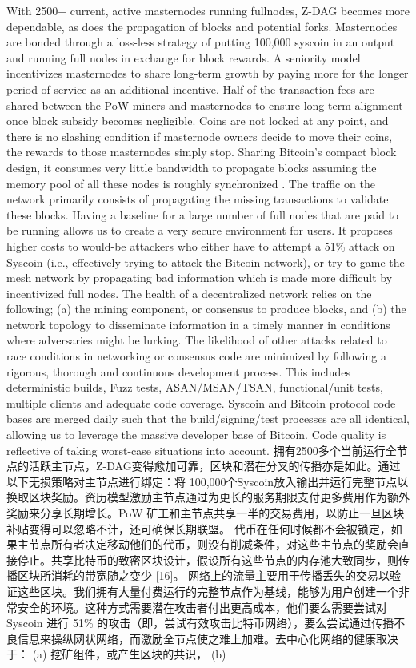 \documentclass{ctexart}
\begin{document}
With 2500+ current, active masternodes running fullnodes, Z-DAG becomes more dependable, as does the propagation of blocks and potential forks. Masternodes are bonded through a loss-less strategy of putting 100,000 syscoin in an output and running full nodes in exchange for block rewards. A seniority model incentivizes masternodes to share long-term growth by paying more for the longer period of service as an additional incentive. Half of the transaction fees are shared between the PoW miners and masternodes to ensure long-term alignment once block subsidy becomes negligible. Coins are not locked at any point, and there is no slashing condition if masternode owners decide to move their coins, the rewards to those masternodes simply stop. Sharing Bitcoin’s compact block design, it consumes very little bandwidth to propagate blocks assuming the memory pool of all these nodes is roughly synchronized \cite{BitCore}. The traffic on the network primarily consists of propagating the missing transactions to validate these blocks. Having a baseline for a large number of full nodes that are paid to be running allows us to create a very secure environment for users. It proposes higher costs to would-be attackers who either have to attempt a 51\% attack on Syscoin (i.e., effectively trying to attack the Bitcoin network), or try to game the mesh network by propagating bad information which is made more difficult by incentivized full nodes. The health of a decentralized network relies on the following; (a) the mining component, or consensus to produce blocks, and (b) the network topology to disseminate information in a timely manner in conditions where adversaries might be lurking. The likelihood of other attacks related to race conditions in networking or consensus code are minimized by following a rigorous, thorough and continuous development process. This includes deterministic builds, Fuzz tests, ASAN/MSAN/TSAN, functional/unit tests, multiple clients and adequate code coverage. Syscoin and Bitcoin protocol code bases are merged daily such that the build/signing/test processes are all identical, allowing us to leverage the massive developer base of Bitcoin.  Code quality is reflective of taking worst-case situations into account. 拥有2500多个当前运行全节点的活跃主节点，Z-DAG变得愈加可靠，区块和潜在分叉的传播亦是如此。通过以下无损策略对主节点进行绑定：将 100,000个Syscoin放入输出并运行完整节点以换取区块奖励。资历模型激励主节点通过为更长的服务期限支付更多费用作为额外奖励来分享长期增长。PoW 矿工和主节点共享一半的交易费用，以防止一旦区块补贴变得可以忽略不计，还可确保长期联盟。 代币在任何时候都不会被锁定，如果主节点所有者决定移动他们的代币，则没有削减条件，对这些主节点的奖励会直接停止。共享比特币的致密区块设计，假设所有这些节点的内存池大致同步，则传播区块所消耗的带宽随之变少 [16]。 网络上的流量主要用于传播丢失的交易以验证这些区块。我们拥有大量付费运行的完整节点作为基线，能够为用户创建一个非常安全的环境。这种方式需要潜在攻击者付出更高成本，他们要么需要尝试对 Syscoin 进行 51\% 的攻击（即，尝试有效攻击比特币网络），要么尝试通过传播不良信息来操纵网状网络，而激励全节点使之难上加难。去中心化网络的健康取决于： (a) 挖矿组件，或产生区块的共识， (b) 
\end{document}
